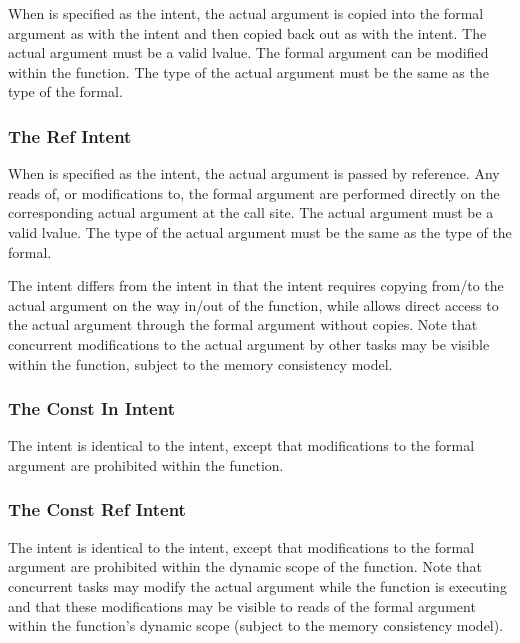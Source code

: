 When  is specified as the intent, the actual argument is
copied into the formal argument as with the  intent and then
copied back out as with the  intent.  The actual argument
must be a valid lvalue.  The formal argument can be modified within
the function.
The type of the actual argument must be the same
as the type of the formal.


\subsubsection{The Ref Intent}
\label{The_Ref_Intent}

When  is specified as the intent, the actual argument is
passed by reference.  Any reads of, or modifications to, the formal
argument are performed directly on the corresponding actual argument
at the call site.  The actual argument must be a valid lvalue.
The type of the actual argument must be the same
as the type of the formal.

The  intent differs from the  intent in that
the  intent requires copying from/to the actual argument on
the way in/out of the function, while  allows direct
access to the actual argument through the formal argument without
copies.  Note that concurrent modifications to the  actual argument by
other tasks may be visible within the function, subject to the memory
consistency model.


\subsubsection{The Const In Intent}
\label{The_Const_In_Intent}

The  intent is identical to the  intent,
except that modifications to the formal argument are prohibited within
the function.


\subsubsection{The Const Ref Intent}
\label{The_Const_Ref_Intent}

The  intent is identical to the  intent,
except that modifications to the formal argument are prohibited within
the dynamic scope of the function.  Note that concurrent tasks may
modify the actual argument while the function is executing and that
these modifications may be visible to reads of the formal argument
within the function's dynamic scope (subject to the memory consistency
model).


